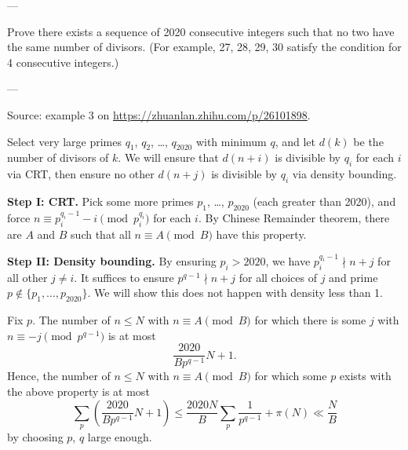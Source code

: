 
---

Prove there exists a sequence of 2020 consecutive integers such that no two have the same number of divisors. (For example, 27, 28, 29, 30 satisfy the condition for 4 consecutive integers.)

---

\begin{remark}
    Source: example 3 on \url{https://zhuanlan.zhihu.com/p/26101898}.
\end{remark}

Select very large primes $q_1$, $q_2$, \ldots, $q_{2020}$ with minimum $q$, and let $d(k)$ be the number of divisors of $k$. We will ensure that $d(n+i)$ is divisible by $q_i$ for each $i$ via CRT, then ensure no other $d(n+j)$ is divisible by $q_i$ via density bounding.

\medskip

\textbf{Step I: CRT.} Pick some more primes $p_1$, \ldots, $p_{2020}$ (each greater than 2020), and force $n\equiv p_i^{q_i-1}-i\pmod{p_i^{q_i}}$ for each $i$. By Chinese Remainder theorem, there are $A$ and $B$ such that all $n\equiv A\pmod B$ have this property.

\medskip

\textbf{Step II: Density bounding.} By ensuring $p_i>2020$, we have $p_i^{q_i-1}\nmid n+j$ for all other $j\ne i$. It suffices to ensure $p^{q-1}\nmid n+j$ for all choices of $j$ and prime $p\notin\{p_1,\ldots,p_{2020}\}$. We will show this does not happen with density less than 1.

Fix $p$. The number of $n\le N$ with $n\equiv A\pmod B$ for which there is some $j$ with $n\equiv -j\pmod{p^{q-1}}$ is at most
\[\frac{2020}{Bp^{q-1}}N+1.\]
Hence, the number of $n\le N$ with $n\equiv A\pmod B$ for which some $p$ exists with the above property is at most
\[\sum_p\left(\frac{2020}{Bp^{q-1}}N+1\right)\le\frac{2020N}B\sum_p\frac1{p^{q-1}}+\pi(N)\ll\frac NB\]
by choosing $p$, $q$ large enough.

